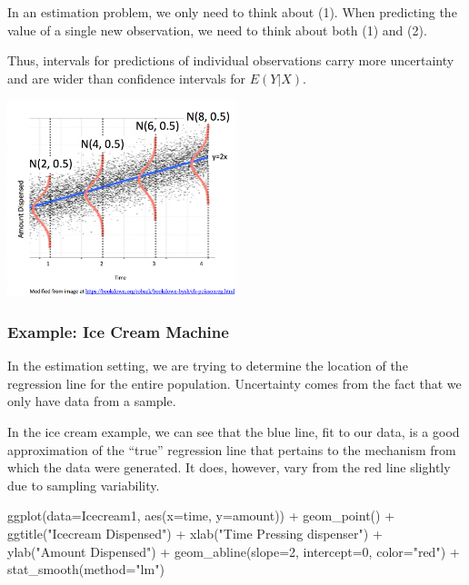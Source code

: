\documentclass[
  letterpaper,
  DIV=11,
  numbers=noendperiod]{scrreprt}
\newenvironment{Shaded}{\begin{snugshade}}{\end{snugshade}}
\newcommand{\AttributeTok}[1]{\textcolor[rgb]{0.40,0.45,0.13}{#1}}
\newcommand{\DecValTok}[1]{\textcolor[rgb]{0.68,0.00,0.00}{#1}}
\newcommand{\FunctionTok}[1]{\textcolor[rgb]{0.28,0.35,0.67}{#1}}
\newcommand{\NormalTok}[1]{\textcolor[rgb]{0.00,0.23,0.31}{#1}}
\newcommand{\SpecialCharTok}[1]{\textcolor[rgb]{0.37,0.37,0.37}{#1}}
\newcommand{\StringTok}[1]{\textcolor[rgb]{0.13,0.47,0.30}{#1}}
\begin{document}
In an estimation problem, we only need to think about (1). When
predicting the value of a single new observation, we need to think about
both (1) and (2).

Thus, intervals for predictions of individual observations carry more
uncertainty and are wider than confidence intervals for \(E(Y|X)\).

\includegraphics[width=0.5\textwidth,height=\textheight]{SLR_Model_Assumptions.png}

\subsubsection{Example: Ice Cream
Machine}\label{example-ice-cream-machine}

In the estimation setting, we are trying to determine the location of
the regression line for the entire population. Uncertainty comes from
the fact that we only have data from a sample.

In the ice cream example, we can see that the blue line, fit to our
data, is a good approximation of the ``true'' regression line that
pertains to the mechanism from which the data were generated. It does,
however, vary from the red line slightly due to sampling variability.

\begin{Shaded}
\begin{Highlighting}[]
\FunctionTok{ggplot}\NormalTok{(}\AttributeTok{data=}\NormalTok{Icecream1, }\FunctionTok{aes}\NormalTok{(}\AttributeTok{x=}\NormalTok{time, }\AttributeTok{y=}\NormalTok{amount)) }\SpecialCharTok{+} \FunctionTok{geom\_point}\NormalTok{() }\SpecialCharTok{+} \FunctionTok{ggtitle}\NormalTok{(}\StringTok{"Icecream Dispensed"}\NormalTok{) }\SpecialCharTok{+} \FunctionTok{xlab}\NormalTok{(}\StringTok{"Time Pressing dispenser"}\NormalTok{) }\SpecialCharTok{+} \FunctionTok{ylab}\NormalTok{(}\StringTok{"Amount Dispensed"}\NormalTok{) }\SpecialCharTok{+} \FunctionTok{geom\_abline}\NormalTok{(}\AttributeTok{slope=}\DecValTok{2}\NormalTok{, }\AttributeTok{intercept=}\DecValTok{0}\NormalTok{, }\AttributeTok{color=}\StringTok{"red"}\NormalTok{) }\SpecialCharTok{+} \FunctionTok{stat\_smooth}\NormalTok{(}\AttributeTok{method=}\StringTok{"lm"}\NormalTok{)}
\end{Highlighting}
\end{Shaded}
\end{document}
